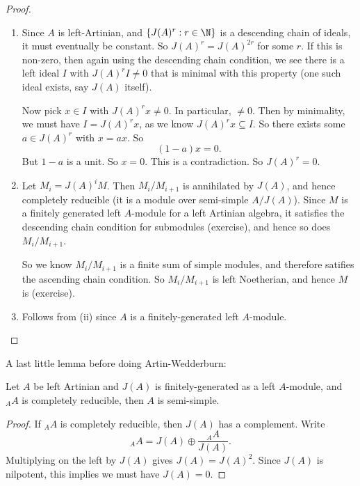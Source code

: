 \documentclass[a4paper]{article}
\begin{document}
\begin{proof}\leavevmode
  \begin{enumerate}
    \item Since $A$ is left-Artinian, and $\{J(A)^r: r \in \N\}$ is a descending chain of ideals, it must eventually be constant. So $J(A)^r = J(A)^{2r}$ for some $r$. If this is non-zero, then again using the descending chain condition, we see there is a left ideal $I$ with $J(A)^r I \not= 0$ that is minimal with this property (one such ideal exists, say $J(A)$ itself).

      Now pick $x \in I$ with $J(A)^r x \not = 0$. In particular, $\not= 0$. Then by minimality, we must have $I = J(A)^r x$, as we know $J(A)^r x \subseteq I$. So there exists some $a \in J(A)^r$ with $x = ax$. So
      \[
        (1 - a) x = 0.
      \]
      But $1 - a$ is a unit. So $x = 0$. This is a contradiction. So $J(A)^r = 0$.
    \item Let $M_i = J(A)^i M$. Then $M_i/M_{i + 1}$ is annihilated by $J(A)$, and hence completely reducible (it is a module over semi-simple $A/J(A)$). Since $M$ is a finitely generated left $A$-module for a left Artinian algebra, it satisfies the descending chain condition for submodules (exercise), and hence so does $M_i/M_{i + 1}$. %

      So we know $M_i/M_{i + 1}$ is a finite sum of simple modules, and therefore satifies the ascending chain condition. So $M_i/M_{i + 1}$ is left Noetherian, and hence $M$ is (exercise).

    \item Follows from (ii) since $A$ is a finitely-generated left $A$-module.
  \end{enumerate}
\end{proof}

A last little lemma before doing Artin-Wedderburn:
\begin{lemma}
  Let $A$ be left Artinian and $J(A)$ is finitely-generated as a left $A$-module, and $_AA$ is completely reducible, then $A$ is semi-simple.
\end{lemma}

\begin{proof}
  If $_AA$ is completely reducible, then $J(A)$ has a complement. Write
  \[
    _A A = J(A) \oplus \frac{_AA}{J(A)}.
  \]
  Multiplying on the left by $J(A)$ gives $J(A) = J(A)^2$. Since $J(A)$ is nilpotent, this implies we must have $J(A) = 0$. %
\end{proof}
\end{document}
